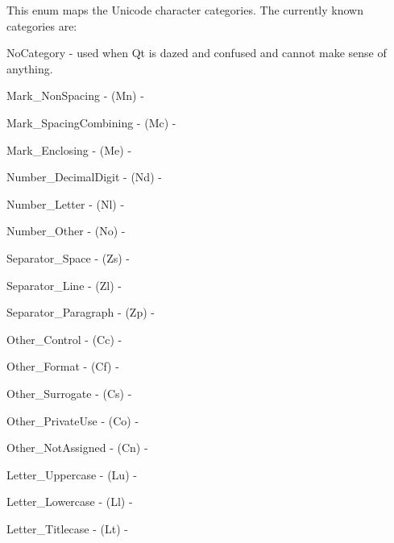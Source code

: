 This enum maps the Unicode character categories. The currently known categories are\+: 
\begin{DoxyItemize}
\item {\ttfamily No\+Category} -\/ used when Qt is dazed and confused and cannot make sense of anything.


\item {\ttfamily Mark\+\_\+\+Non\+Spacing} -\/ (Mn) -\/


\item {\ttfamily Mark\+\_\+\+Spacing\+Combining} -\/ (Mc) -\/


\item {\ttfamily Mark\+\_\+\+Enclosing} -\/ (Me) -\/


\item {\ttfamily Number\+\_\+\+Decimal\+Digit} -\/ (Nd) -\/


\item {\ttfamily Number\+\_\+\+Letter} -\/ (Nl) -\/


\item {\ttfamily Number\+\_\+\+Other} -\/ (No) -\/


\item {\ttfamily Separator\+\_\+\+Space} -\/ (Zs) -\/


\item {\ttfamily Separator\+\_\+\+Line} -\/ (Zl) -\/


\item {\ttfamily Separator\+\_\+\+Paragraph} -\/ (Zp) -\/


\item {\ttfamily Other\+\_\+\+Control} -\/ (Cc) -\/


\item {\ttfamily Other\+\_\+\+Format} -\/ (Cf) -\/


\item {\ttfamily Other\+\_\+\+Surrogate} -\/ (Cs) -\/


\item {\ttfamily Other\+\_\+\+Private\+Use} -\/ (Co) -\/


\item {\ttfamily Other\+\_\+\+Not\+Assigned} -\/ (Cn) -\/


\item {\ttfamily Letter\+\_\+\+Uppercase} -\/ (Lu) -\/


\item {\ttfamily Letter\+\_\+\+Lowercase} -\/ (Ll) -\/


\item {\ttfamily Letter\+\_\+\+Titlecase} -\/ (Lt) -\/



\end{DoxyItemize}

